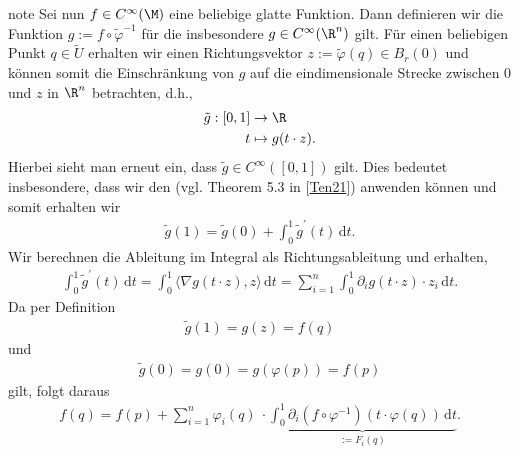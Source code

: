 \documentclass[letterpaper,10pt,english]{jupyterBook}
\begin{document}
\begin{sphinxadmonition}{note}
\sphinxAtStartPar
Sei nun \(f\in C^\infty(\M)\) eine beliebige glatte Funktion.
Dann definieren wir die Funktion \(g:= f\circ \tilde{\varphi}^{-1}\) für die insbesondere \(g\in C^\infty(\R^n)\) gilt.
Für einen beliebigen Punkt \(q\in\tilde{U}\) erhalten wir einen Richtungsvektor \(z:=\tilde{\varphi}(q)\in B_r(0)\) und können somit die Einschränkung von \(g\) auf die eindimensionale Strecke zwischen \(0\) und \(z\) in \(\R^n\) betrachten, d.h.,
\begin{equation*}
\begin{split}\tilde{g}:[0,1] &\to\R\\
t&\mapsto g(t\cdot z).\end{split}
\end{equation*}
\sphinxAtStartPar
Hierbei sieht man erneut ein, dass \(\tilde{g}\in C^\infty([0,1])\) gilt.
Dies bedeutet insbesondere, dass wir den  (vgl. Theorem 5.3 in {[}\hyperlink{cite.references:id12}{Ten21}{]}) anwenden können und somit erhalten wir
\begin{equation*}
\begin{split}\tilde{g}(1) = \tilde{g}(0) + \int_{0}^1 \tilde{g}^\prime(t)\,\mathrm{d}t.\end{split}
\end{equation*}
\sphinxAtStartPar
Wir berechnen die Ableitung im Integral als Richtungsableitung und erhalten,
\begin{equation*}
\begin{split}\int_{0}^1 \tilde{g}^\prime(t) \,\mathrm{d}t
=\int_{0}^1 \langle \nabla g (t\cdot z), z \rangle \,\mathrm{d}t
=\sum_{i=1}^{n} \int_{0}^1  \partial_i g (t\cdot z) \cdot z_i \,\mathrm{d}t.\end{split}
\end{equation*}
\sphinxAtStartPar
Da per Definition
\begin{equation*}
\begin{split}\tilde{g}(1) = g(z)=f(q)\end{split}
\end{equation*}
\sphinxAtStartPar
und
\begin{equation*}
\begin{split}\tilde{g}(0) = g(0) = g(\varphi(p))=f(p)\end{split}
\end{equation*}
\sphinxAtStartPar
gilt, folgt daraus
\begin{equation*}
\begin{split}f(q) = 
f(p) + 
\sum_{i=1}^{n} \varphi_i(q)\ \cdot \underbrace{\int_{0}^1  \partial_i (f\circ \varphi^{-1})(t\cdot \varphi(q)) \, \mathrm{d}t}_{:=F_i(q)}.\end{split}

\end{equation*}
\end{sphinxadmonition}
\end{document}

